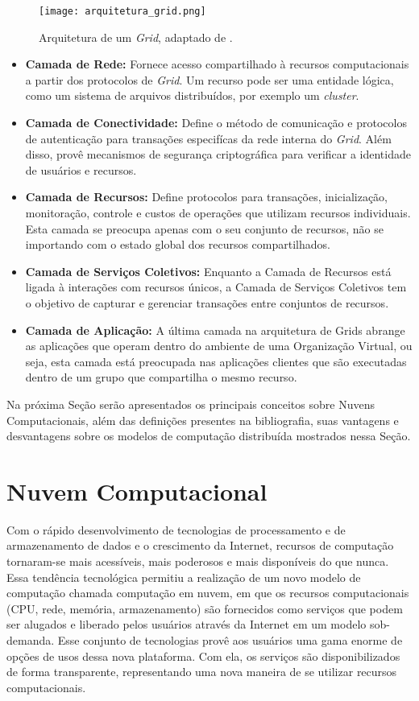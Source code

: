 \begin{figure}[h!]
	\centering
	\texttt{[image: arquitetura\_grid.png]}
	\caption{Arquitetura de um \textit{Grid}, adaptado de \cite{cloud_360}.}
	\label{fig:grid_architecture}
\end{figure}

\begin{itemize}
	\item \textbf{Camada de Rede:} Fornece acesso compartilhado à recursos computacionais a partir dos protocolos de \textit{Grid}. Um recurso pode ser uma entidade lógica, como um sistema de arquivos distribuídos, por exemplo um \textit{cluster}.
	\item \textbf{Camada de Conectividade:} Define o método de comunicação e protocolos de autenticação para transações especifícas da rede interna do \textit{Grid}. Além disso, provê mecanismos de segurança criptográfica para verificar a identidade de usuários e recursos.
	\item \textbf{Camada de Recursos:} Define protocolos para transações, inicialização, monitoração, controle e custos de operações que utilizam recursos individuais. Esta camada se preocupa apenas com o seu conjunto de recursos, não se importando com o estado global dos recursos compartilhados.
	\item \textbf{Camada de Serviços Coletivos:} Enquanto a Camada de Recursos está ligada à interações com recursos únicos, a Camada de Serviços Coletivos tem o objetivo de capturar e gerenciar transações entre conjuntos de recursos.
	\item \textbf{Camada de Aplicação:} A última camada na arquitetura de Grids abrange as aplicações que operam dentro do ambiente de uma Organização Virtual, ou seja, esta camada está preocupada nas aplicações clientes que são executadas dentro de um grupo que compartilha o mesmo recurso.
\end{itemize}

Na próxima Seção serão apresentados os principais conceitos sobre Nuvens Computacionais, além das definições presentes na bibliografia, suas vantagens e desvantagens sobre os modelos de computação distribuída mostrados nessa Seção.

\section{Nuvem Computacional} \label{cap2sec2} 

Com o rápido desenvolvimento de tecnologias de processamento e de armazenamento de dados e o crescimento da Internet, recursos de computação tornaram-se mais acessíveis, mais poderosos e mais disponíveis do que nunca. Essa tendência tecnológica permitiu a realização de um novo modelo de computação chamada computação em nuvem, em que os recursos computacionais (CPU, rede, memória, armazenamento) são fornecidos como serviços que podem ser alugados e liberado pelos usuários através da Internet em um modelo sob-demanda. Esse conjunto de tecnologias provê aos usuários uma gama enorme de opções de usos dessa nova plataforma. Com ela, os serviços são disponibilizados de forma transparente, representando uma nova maneira de se utilizar recursos computacionais. 

